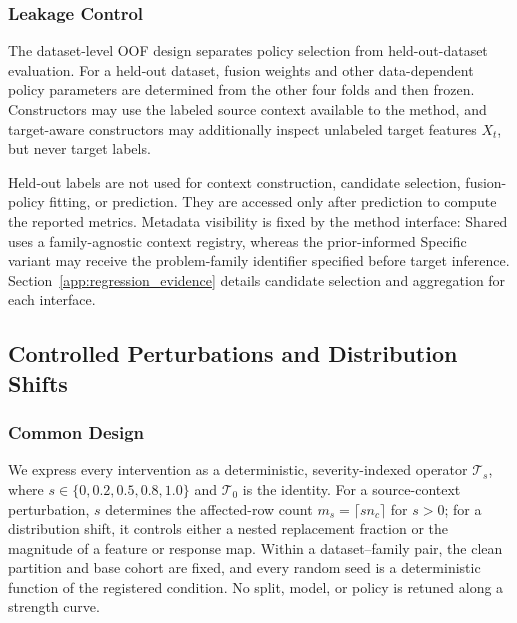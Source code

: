 \subsubsection{Leakage Control}
\label{app:leakage_control}

The dataset-level OOF design separates policy selection from held-out-dataset
evaluation. For a held-out dataset, fusion weights and other data-dependent
policy parameters are determined from the other four folds and then frozen.
Constructors may use the labeled source context available to the method, and
target-aware constructors may additionally inspect unlabeled target features
$X_t$, but never target labels.

Held-out labels are not used for context construction, candidate selection,
fusion-policy fitting, or prediction.  They are accessed only after prediction
to compute the reported metrics.  Metadata visibility is fixed by the method
interface: Shared uses a family-agnostic context registry, whereas the
prior-informed Specific variant may receive the problem-family identifier
specified before target inference.  Section~\ref{app:regression_evidence}
details candidate selection and aggregation for each interface.

\subsection{Controlled Perturbations and Distribution Shifts}
\label{app:data_transformations}

\subsubsection{Common Design}

We express every intervention as a deterministic, severity-indexed operator
$\mathcal T_s$, where $s\in\{0,0.2,0.5,0.8,1.0\}$ and $\mathcal T_0$ is the
identity.  For a source-context perturbation, $s$ determines the affected-row
count $m_s=\lceil s n_c\rceil$ for $s>0$; for a distribution shift, it controls
either a nested replacement fraction or the magnitude of a feature or response
map.  Within a dataset--family pair, the clean partition and base cohort are
fixed, and every random seed is a deterministic function of the registered
condition.  No split, model, or policy is retuned along a strength curve.

